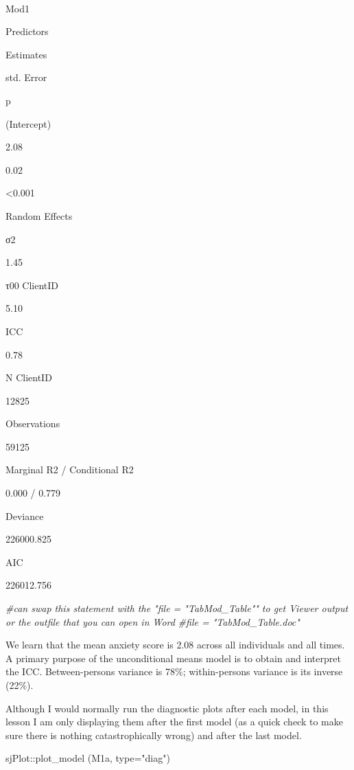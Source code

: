 \documentclass[
  11pt,
]{book}
\newenvironment{Shaded}{\begin{snugshade}}{\end{snugshade}}
\newcommand{\AttributeTok}[1]{\textcolor[rgb]{0.77,0.63,0.00}{#1}}
\newcommand{\CommentTok}[1]{\textcolor[rgb]{0.56,0.35,0.01}{\textit{#1}}}
\newcommand{\FunctionTok}[1]{\textcolor[rgb]{0.00,0.00,0.00}{#1}}
\newcommand{\NormalTok}[1]{#1}
\newcommand{\SpecialCharTok}[1]{\textcolor[rgb]{0.00,0.00,0.00}{#1}}
\newcommand{\StringTok}[1]{\textcolor[rgb]{0.31,0.60,0.02}{#1}}
\begin{document}
~

Mod1

Predictors

Estimates

std. Error

p

(Intercept)

2.08

0.02

\textless0.001

Random Effects

σ2

1.45

τ00 ClientID

5.10

ICC

0.78

N ClientID

12825

Observations

59125

Marginal R2 / Conditional R2

0.000 / 0.779

Deviance

226000.825

AIC

226012.756

\begin{Shaded}
\begin{Highlighting}[]
\CommentTok{\#can swap this statement with the "file = "TabMod\_Table"" to get Viewer output or the outfile that you can open in Word}
\CommentTok{\#file = "TabMod\_Table.doc"}
\end{Highlighting}
\end{Shaded}

We learn that the mean anxiety score is 2.08 across all individuals and all times. A primary purpose of the unconditional means model is to obtain and interpret the ICC. Between-persons variance is 78\%; within-persons variance is its inverse (22\%).

Although I would normally run the diagnostic plots after each model, in this lesson I am only displaying them after the first model (as a quick check to make sure there is nothing catastrophically wrong) and after the last model.

\begin{Shaded}
\begin{Highlighting}[]
\NormalTok{sjPlot}\SpecialCharTok{::}\FunctionTok{plot\_model}\NormalTok{ (M1a, }\AttributeTok{type=}\StringTok{"diag"}\NormalTok{)}
\end{Highlighting}
\end{Shaded}
\end{document}
